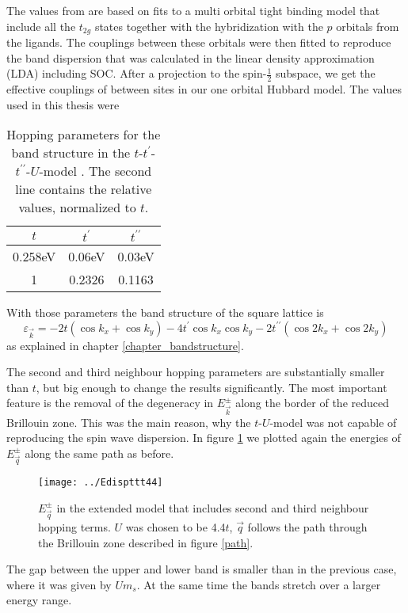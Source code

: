The values from \cite{PhysRevLett.106.136402} are based on fits to a multi orbital tight binding model that include all the $t_{2g}$ states 
together with the hybridization with the $p$ orbitals from the ligands.
The couplings between these orbitals were then fitted to reproduce the band dispersion that was calculated in the linear density approximation (LDA) including SOC. 
After a projection to the spin-$\frac12$ subspace, we get the effective couplings of between sites in our one orbital Hubbard model.
The values used in this thesis were 
%
\begin{table}
\begin{center}
\begin{tabular}{|c|c|c|}
\hline
$t$ & $t^{\prime}$ & $t^{\prime \prime}$ \\
\hline
0.258eV & 0.06eV & 0.03eV \\
1 & 0.2326 & 0.1163 \\
\hline
\end{tabular}
\caption{Hopping parameters for the band structure in the $t$-$t^{\prime}$-$t^{\prime\prime}$-$U$-model \cite{PhysRevLett.106.136402}.
The second line contains the relative values, normalized to $t$. }
\label{ttt}
\end{center} 
\end{table}
%
With those parameters the band structure of the square lattice is 
\begin{equation}
  \varepsilon_{\vec k } = -2t \left(\cos k_x + \cos k_y \right) -4t^{\prime} \cos k_x \cos k_y  -2t^{\prime \prime} \left( \cos 2k_x + \cos 2k_y \right)
\end{equation}
as explained in chapter \ref{chapter_bandstructure}.



The second and third neighbour hopping parameters are substantially smaller than $t$, but big enough to change the 
results significantly. 
 The most important feature is the removal of the degeneracy in $E^{\pm}_{\vec k}$ along the border of the reduced Brillouin zone.
This was the main reason, why the $t$-$U$-model was not capable of reproducing the spin wave dispersion. 
In figure \ref{tttE42} we plotted again the energies of $E^{\pm}_{\vec q}$ along the same path as before.
\begin{figure}
 \centering
\texttt{[image: ../Edispttt44]}
 \caption{$E^{\pm}_{\vec q}$ in the extended model that includes second and third neighbour hopping terms.
 $U$ was chosen to be 4.4$t$,
 $\vec q$ follows the path through the Brillouin zone described in figure \ref{path}. }
 \label{tttE42}
\end{figure}
The gap between the upper and lower band is smaller than in the previous case, where it was given by $Um_s$.
At the same time the bands stretch over a larger energy range.





